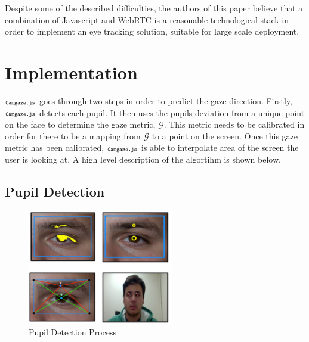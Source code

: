 \documentclass[annual]{acmsiggraph}
\newcommand{\Acronym}[1]{\ensuremath{{\small{\texttt{#1}}}}}
\newcommand{\Name}{\Acronym{Camgaze.js}} \newcommand{\False}{\Constant{false}}
\newcommand{\True}{\Constant{true}}
\newcommand{\Symbol}[1]{\ensuremath{\mathcal{#1}}}
\newcommand{\Function}[1]{\ensuremath{{\small \textsc{#1}}}}
\newcommand{\Constant}[1]{\ensuremath{\small{\texttt{#1}}}}
\begin{document}
Despite some of the described difficulties, the authors of this paper believe
that a combination of Javascript and WebRTC is a reasonable technological stack
in order to implement an eye tracking solution, suitable for large scale
deployment.


\section{Implementation}

$\Name$ goes through two steps in order to predict the gaze direction.
Firstly, $\Name$ detects each pupil. It then uses the pupils deviation
from a unique point on the face to determine the gaze metric, \Symbol{G}.
This metric needs to be calibrated in order for there to be a mapping
from \Symbol{G} to a point on the screen. Once this gaze metric has been
calibrated, $\Name$ is able to interpolate area of the screen the user is
looking at. A high level description of the algortihm is shown below.

%
%
%
%
%

\subsection{Pupil Detection}

\begin{figure}[ht]

    \centering

    \includegraphics[width=2.5in]{figs/pupilDetection.pdf}

    \caption{Pupil Detection Process}

\end{figure}
\end{document}

